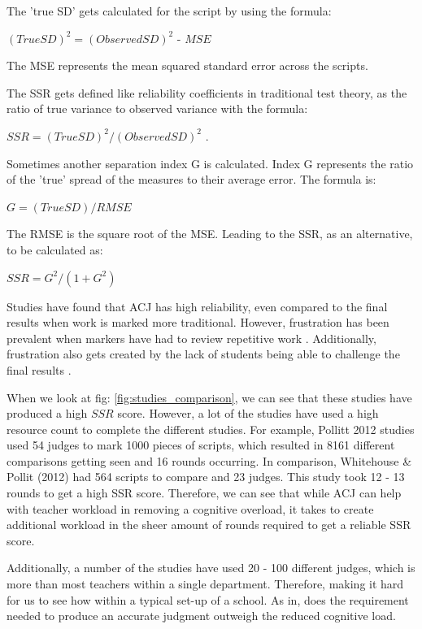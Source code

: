 		The 'true SD' gets calculated for the script by using the formula:
			\begin{center}
				$(True SD)^{2} = (Observed SD)^{2} \text{ - } MSE$
			\end{center}
		 
		The MSE represents the mean squared standard error across the scripts. 
		
		The SSR gets defined like reliability coefficients in traditional test theory, as the ratio of true variance to observed variance with the formula: 
		\begin{center}
			
		$SSR = (True SD)^{2} / (Observed SD)^{2}$ .
		\end{center}
		Sometimes another separation index G is calculated. Index G represents the ratio of the 'true' spread of the measures to their average error. The formula is: 
		\begin{center}
			$G = (True SD) / RMSE$
		\end{center}
		The RMSE is the square root of the MSE. Leading to the SSR, as an alternative, to be calculated as:
		\begin{center}
			$SSR = G^2 / (1+G^2 )$
		\end{center}
	
		Studies have found that ACJ has high reliability, even compared to the final results when work is marked more traditional. However,  frustration has been prevalent when markers have had to review repetitive work \cite{bartholomew2019tool}. Additionally, frustration also gets created by the lack of students being able to challenge the final results \cite{bartholomew2019tool}. 
		
		When we look at fig: \ref{fig:studies_comparison}, we can see that these studies have produced a high $SSR$ score. However, a lot of the studies have used a high resource count to complete the different studies. For example, Pollitt 2012 studies used 54 judges to mark 1000 pieces of scripts, which resulted in 8161 different comparisons getting seen and 16 rounds occurring. In comparison, Whitehouse \& Pollit (2012) had 564 scripts to compare and 23 judges. This study took 12 - 13 rounds to get a high SSR score. Therefore, we can see that while ACJ can help with teacher workload in removing a cognitive overload, it takes to create additional workload in the sheer amount of rounds required to get a reliable SSR score.
		
		Additionally, a number of the studies have used 20 - 100 different judges, which is more than most teachers within a single department. Therefore, making it hard for us to see how within a typical set-up of a school. As in, does the requirement needed to produce an accurate judgment outweigh the reduced cognitive load. 
		
